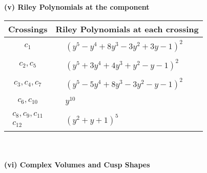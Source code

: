 \documentclass[1p]{elsarticle_modified}
\theoremstyle{definition}
\begin{document}
\newpage\renewcommand{\arraystretch}{1}
\flushleft \textbf{(v) Riley Polynomials at the component}\newline \\
\begin{tabular}{m{50pt}|m{274pt}}
Crossings & \hspace{64pt}Riley Polynomials at each crossing \\
\hline $$\begin{aligned}c_{1}\end{aligned}$$&$\begin{aligned}
&(y^5- y^4+8 y^3-3 y^2+3 y-1)^2
\end{aligned}$\\
\hline $$\begin{aligned}c_{2},c_{5}\end{aligned}$$&$\begin{aligned}
&(y^5+3 y^4+4 y^3+y^2- y-1)^2
\end{aligned}$\\
\hline $$\begin{aligned}c_{3},c_{4},c_{7}\end{aligned}$$&$\begin{aligned}
&(y^5-5 y^4+8 y^3-3 y^2- y-1)^2
\end{aligned}$\\
\hline $$\begin{aligned}c_{6},c_{10}\end{aligned}$$&$\begin{aligned}
&y^{10}
\end{aligned}$\\
\hline $$\begin{aligned}c_{8},c_{9},c_{11}\\c_{12}\end{aligned}$$&$\begin{aligned}
&(y^2+y+1)^5
\end{aligned}$\\
\hline
\end{tabular}\\~\\
\newpage\flushleft \textbf{(vi) Complex Volumes and Cusp Shapes}
\end{document}
